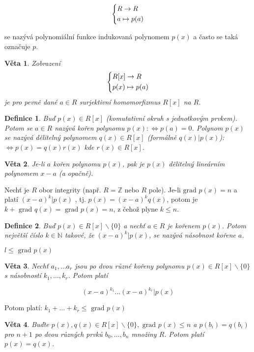 \documentclass[a4paper, 11pt]{report}
\newtheorem{mydef}{Definice}[chapter]
\newtheorem{veta}{Věta}
\begin{document}
$$ \begin{dcases}
R \to R \\
a \mapsto p(a)
\end{dcases} $$

se nazývá polynomiální funkce indukovaná polynomem $p(x)$ a často se taká označuje $p$.

\begin{veta}
Zobrazení
$$ \begin{dcases}
R[x] \to R \\
p(x) \mapsto p(a)
\end{dcases} $$
je pro pevně dané $a \in R$ surjektivní homomorfizmus $R[x]$ na $R$.
\end{veta}

\begin{mydef}
Buď $p(x) \in R[x]$ (komutativní okruh s jednotkovým prvkem). Potom se $a \in R$ nazývá kořen polynomu $p(x): \Leftrightarrow p(a) = 0$. Polynom $p(x)$ se nazývá dělitelný polynomem $q(x) \in R[x]$ (formálně $q(x) | p(x)$): $\Leftrightarrow p(x) = q(x)r(x)$ kde $r(x) \in R[x]$.
\end{mydef}

\begin{veta}
Je-li $a$ kořen polynomu $p(x)$, pak je $p(x)$ dělitelný lineárním polynomem $x - a$ (a opačně).
\end{veta}

Nechť je $R$ obor integrity (např. $R = \mathbb{Z}$ nebo $R$ pole). Je-li $\text{grad } p(x) = n$ a platí $(x - a)^k | p(x)$ , tj. $p(x) = (x -a)^k q(x)$, potom je $k + \text{ grad } q(x) = \text{ grad } p(x) = n$, z čehož plyne $k \leq n$.

\begin{mydef}
Buď $p(x) \in R[x] \backslash \{0\}$ a nechť $a \in R$ je kořenem $p(x)$. Potom největší číslo $k \in \mathbb{N}$ takové, že $(x - a)^k | p(x)$, se nazývá násobnost kořene $a$.

$l \leq \text{ grad } p(x)$
\end{mydef}

\begin{veta}
Nechť $a_1, \dots a_r$ jsou po dvou různé kořeny polynomu $p(x) \in R[x] \backslash \{0\}$ s násobností $k_1 ,\dots, k_r$. Potom platí

$$ (x - a)^{k_1} \dots (x - a)^{k_r} | p(x)$$
\end{veta}

Potom platí: $k_1 + \dots + k_r \leq \text{ grad } p(x)$

\begin{veta}
Buďte $p(x), q(x) \in R[x] \backslash \{0\}, \text{ grad } p(x) \leq n$ a $p(b_i) = q(b_i)$ pro $n+1$ po dvou různých prvků $b_0, \dots, b_n$ množiny $R$. Potom platí $p(x) = q(x)$.
\end{veta}
\end{document}
